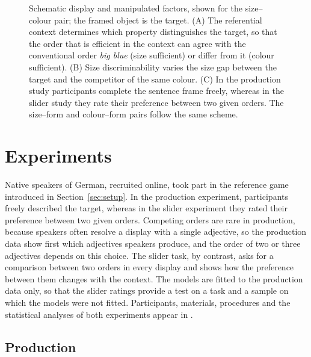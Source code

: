 \documentclass[10pt,a4paper,fleqn]{article}
\begin{document}
\begin{figure}[htbp]
\caption{Schematic display and manipulated factors, shown for the size--colour pair; the framed object is the target.
(A) The referential context determines which property distinguishes the target, so that the order that is efficient in the context can agree with the conventional order \emph{big blue} (size sufficient) or differ from it (colour sufficient).
(B) Size discriminability varies the size gap between the target and the competitor of the same colour.
(C) In the production study participants complete the sentence frame freely, whereas in the slider study they rate their preference between two given orders.
The size--form and colour--form pairs follow the same scheme.}
\label{fig:schematic}
\end{figure}

\section{Experiments}
\label{sec:experiments}

Native speakers of German, recruited online, took part in the reference game introduced in Section~\ref{sec:setup}.
In the production experiment, participants freely described the target, whereas in the slider experiment they rated their preference between two given orders.
Competing orders are rare in production, because speakers often resolve a display with a single adjective, so the production data show first which adjectives speakers produce, and the order of two or three adjectives depends on this choice.
The slider task, by contrast, asks for a comparison between two orders in every display and shows how the preference between them changes with the context.
The models are fitted to the production data only, so that the slider ratings provide a test on a task and a sample on which the models were not fitted.
Participants, materials, procedures and the statistical analyses of both experiments appear in .

\subsection{Production}
\label{sec:exp:production}
\end{document}
